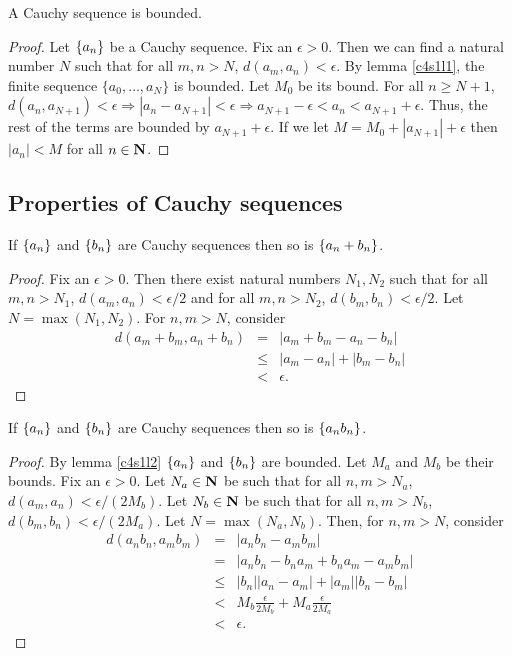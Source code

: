 \begin{lem}\label{c4s1l2}
A Cauchy sequence is bounded.
\end{lem}
\begin{proof}
Let $\{a_n\}$ be a Cauchy sequence. Fix an $\epsilon > 0$. Then we can 
find a natural number $N$ such that for all $m, n > N$, $d(a_m, a_n) < 
\epsilon$. By lemma \ref{c4s1l1}, the finite sequence $\{a_0, \ldots,
a_N\}$ is bounded. Let $M_0$ be its bound. For all $n \ge N + 1$, $d(a_n,
a_{N+1}) < \epsilon \Rightarrow |a_n - a_{N+1}| < \epsilon \Rightarrow
a_{N+1} - \epsilon < a_n < a_{N+1} + \epsilon$. Thus, the rest of the
terms are bounded by $a_{N+1} + \epsilon$. If we let $M = M_0 + |a_{N+1}|
+ \epsilon$ then $|a_n| < M$ for all $n \in \mathbf{N}$.
\end{proof}

\subsection{Properties of Cauchy sequences}
\begin{lem}\label{c4s1l3}
If $\{a_n\}$ and $\{b_n\}$ are Cauchy sequences then so is $\{a_n
+ b_n\}$.
\end{lem}
\begin{proof}
Fix an $\epsilon > 0$. Then there exist natural numbers $N_1, N_2$ such
that for all $m, n > N_1$, $d(a_m, a_n) < \epsilon/2$ and for all $m, n >
N_2$, $d(b_m, b_n) < \epsilon/2$. Let $N = \max(N_1, N_2)$. For $n, m > N$,
consider 
\begin{eqnarray*}
d(a_m + b_m, a_n + b_n) &=& |a_m + b_m - a_n - b_n| \\
 &\le& |a_m - a_n| + |b_m - b_n| \\
 &<& \epsilon.
\end{eqnarray*}
\end{proof}

\begin{lem}\label{c4s1l4}
If $\{a_n\}$ and $\{b_n\}$ are Cauchy sequences then so is $\{a_n
b_n\}$.
\end{lem}
\begin{proof}
By lemma \ref{c4s1l2} $\{a_n\}$ and $\{b_n\}$ are bounded. Let $M_a$
and $M_b$ be their bounds. Fix an $\epsilon > 0$. Let $N_a \in \mathbf{N}$ be
such that for all $n, m > N_a$, $d(a_m, a_n) < \epsilon/(2M_b)$. Let $N_b 
\in \mathbf{N}$ be such that for all $n, m > N_b$, $d(b_m, b_n) < \epsilon/
(2M_a)$.  Let $N = \max(N_a, N_b)$. Then, for $n, m > N$, consider
\begin{eqnarray*}
d(a_nb_n, a_mb_m) &=& |a_nb_n - a_mb_m| \\
 &=& |a_nb_n - b_na_m + b_na_m - a_mb_m| \\
 &\le& |b_n||a_n - a_m| + |a_m||b_n - b_m| \\
 &<& M_b\frac{\epsilon}{2M_b} + M_a\frac{\epsilon}{2M_a} \\
 &<& \epsilon.
\end{eqnarray*}
\end{proof}

